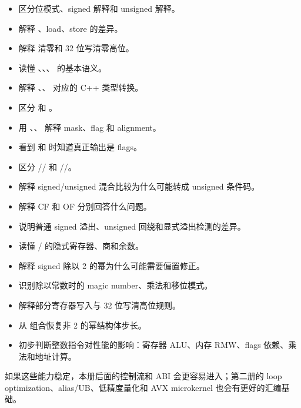 \begin{itemize}
  \item 区分位模式、signed 解释和 unsigned 解释。
  \item 解释 、load、store 的差异。
  \item 解释  清零和 32 位写清零高位。
  \item 读懂 、、、 的基本语义。
  \item 解释 、、 对应的 C++ 类型转换。
  \item 区分  和 。
  \item 用 、、 解释 mask、flag 和 alignment。
  \item 看到  和  时知道真正输出是 flags。
  \item 区分 // 和 //。
  \item 解释 signed/unsigned 混合比较为什么可能转成 unsigned 条件码。
  \item 解释 CF 和 OF 分别回答什么问题。
  \item 说明普通 signed 溢出、unsigned 回绕和显式溢出检测的差异。
  \item 读懂 / 的隐式寄存器、商和余数。
  \item 解释 signed 除以 2 的幂为什么可能需要偏置修正。
  \item 识别除以常数时的 magic number、乘法和移位模式。
  \item 解释部分寄存器写入与 32 位写清高位规则。
  \item 从  组合恢复非 2 的幂结构体步长。
  \item 初步判断整数指令对性能的影响：寄存器 ALU、内存 RMW、flags 依赖、乘法和地址计算。
\end{itemize}

如果这些能力稳定，本册后面的控制流和 ABI 会更容易进入；第二册的 loop optimization、alias/UB、低精度量化和 AVX microkernel 也会有更好的汇编基础。
